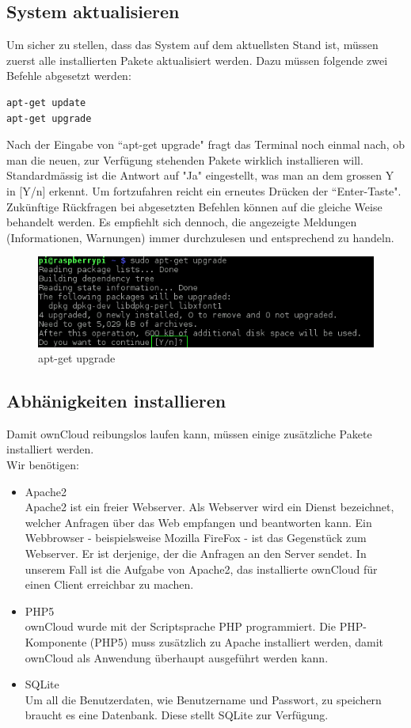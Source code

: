 \subsection{System aktualisieren}
Um sicher zu stellen, dass das System auf dem aktuellsten Stand ist, müssen zuerst alle installierten Pakete aktualisiert werden. Dazu müssen folgende zwei Befehle abgesetzt werden:

\begin{lstlisting}
apt-get update
apt-get upgrade
\end{lstlisting}

Nach der Eingabe von ``apt-get upgrade" fragt das Terminal noch einmal nach, ob man die neuen, zur Verfügung stehenden Pakete wirklich installieren will. Standardmässig ist die Antwort auf "Ja" eingestellt, was man an dem grossen Y in [Y/n] erkennt. Um fortzufahren reicht ein erneutes Drücken der ``Enter-Taste". Zukünftige Rückfragen bei abgesetzten Befehlen können auf die gleiche Weise behandelt werden. Es empfiehlt sich dennoch, die angezeigte Meldungen (Informationen, Warnungen) immer durchzulesen und entsprechend zu handeln.

\begin{figure}[h]
\centering
\includegraphics[scale=0.7]{images/upgrade}
\caption{apt-get upgrade}
\end{figure}

\subsection{Abhänigkeiten installieren}
Damit ownCloud reibungslos laufen kann, müssen einige zusätzliche Pakete installiert werden.
\\
Wir benötigen:

\begin{itemize}
\item Apache2 \\
Apache2 ist ein freier Webserver. Als Webserver wird ein Dienst bezeichnet, welcher Anfragen über das Web empfangen und beantworten kann. Ein Webbrowser - beispielsweise Mozilla FireFox - ist das Gegenstück zum Webserver. Er ist derjenige, der die Anfragen an den Server sendet. In unserem Fall ist die Aufgabe von Apache2, das installierte ownCloud für einen Client erreichbar zu machen.
\item PHP5 \\
ownCloud wurde mit der Scriptsprache PHP programmiert. Die PHP-Komponente (PHP5) muss zusätzlich zu Apache installiert werden, damit ownCloud als Anwendung überhaupt ausgeführt werden kann.
\item SQLite \\
Um all die Benutzerdaten, wie Benutzername und Passwort, zu speichern braucht es eine Datenbank. Diese stellt SQLite zur Verfügung.
\end{itemize}


